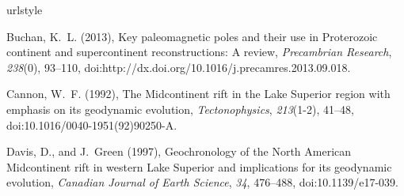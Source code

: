 \documentclass[draft,gc]{AGUTeX}
\begin{document}
\begin{article}
\begin{acknowledgments}
\end{acknowledgments}

%
%
%
%
%
%
%
%
%

%

\begin{thebibliography}{24}
\providecommand{\natexlab}[1]{#1}
\expandafter\ifx\csname urlstyle\endcsname\relax
  \providecommand{\doi}[1]{doi:\discretionary{}{}{}#1}\else
  \providecommand{\doi}{doi:\discretionary{}{}{}\begingroup
  \urlstyle{rm}\Url}\fi

Buchan, K.~L. (2013), Key paleomagnetic poles and their use in Proterozoic
  continent and supercontinent reconstructions: A review, \textit{Precambrian
  Research}, \textit{238}(0), 93--110,
  \doi{http://dx.doi.org/10.1016/j.precamres.2013.09.018}.

Cannon, W.~F. (1992), The {Midcontinent rift in the Lake Superior} region with
  emphasis on its geodynamic evolution, \textit{Tectonophysics},
  \textit{213}(1-2), 41--48, \doi{10.1016/0040-1951(92)90250-A}.

Davis, D., and J.~Green (1997), Geochronology of the {N}orth {A}merican
  {M}idcontinent rift in western {L}ake {S}uperior and implications for its geodynamic evolution, \textit{Canadian Journal of Earth Science},
  \textit{34}, 476--488, \doi{10.1139/e17-039}.


\end{thebibliography}
\end{article}
\end{document}
